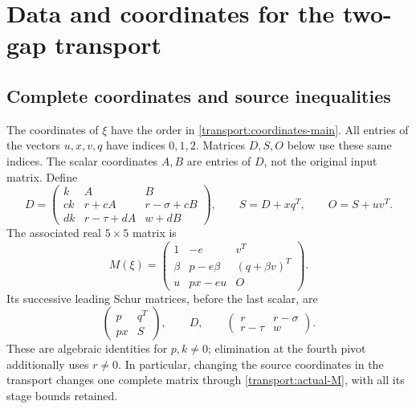 \documentclass[11pt,reqno]{amsart}
\theoremstyle{definition}
\theoremstyle{remark}
\begin{document}
\section{Data and coordinates for the two-gap transport}
\label{transport:details}
\subsection{Complete coordinates and source inequalities}
\label{transport:source-detail}

The coordinates of \(\xi\) have the order in
\eqref{transport:coordinates-main}.  All entries of the vectors
\(u,x,v,q\) have indices \(0,1,2\).  Matrices \(D,S,O\) below use
these same indices.  The scalar coordinates \(A,B\) are entries of
\(D\), not the original input matrix.  Define
\begin{equation}\label{transport:actual-D}
D=\begin{pmatrix}
k&A&B\\
ck&r+cA&r-\sigma+cB\\
dk&r-\tau+dA&w+dB
\end{pmatrix},\qquad S=D+xq^T,\qquad O=S+uv^T.
\end{equation}
The associated real \(5\times5\) matrix is
\begin{equation}\label{transport:actual-M}
M(\xi)=
\begin{pmatrix}
1&-e&v^T\\
\beta&p-e\beta&(q+\beta v)^T\\
u&px-eu&O
\end{pmatrix}.
\end{equation}
Its successive leading Schur matrices, before the last scalar, are
\begin{equation}\label{transport:actual-stages}
\begin{pmatrix}p&q^T\\px&S\end{pmatrix},\qquad
D,\qquad
\begin{pmatrix}r&r-\sigma\\r-\tau&w\end{pmatrix}.
\end{equation}
These are algebraic identities for \(p,k\ne0\); elimination at the
fourth pivot additionally uses \(r\ne0\).  In particular, changing
the source coordinates in the transport changes one complete matrix
through \eqref{transport:actual-M}, with all its stage bounds retained.
\end{document}
